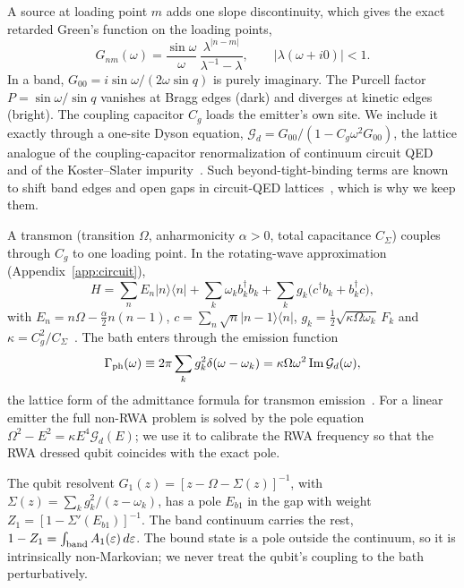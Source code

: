 \documentclass[aps,prresearch,twocolumn,superscriptaddress,nofootinbib,longbibliography,floatfix]{revtex4-2}
\newcommand{\G}{\mathcal{G}}
\begin{document}
A source at loading point $m$ adds one slope discontinuity, which gives the exact retarded
Green's function on the loading points,
\begin{equation}
G_{nm}(\omega)=\frac{\sin\omega}{\omega}\,\frac{\lambda^{|n-m|}}{\lambda^{-1}-\lambda},\qquad |\lambda(\omega+i0)|<1 .
\label{eq:green}
\end{equation}
In a band, $G_{00}=i\sin\omega/(2\omega\sin q)$ is purely imaginary. The Purcell factor $P=\sin\omega/\sin q$ vanishes
at Bragg edges (dark) and diverges at kinetic edges (bright). The coupling capacitor $C_g$ loads the
emitter's own site. We include it exactly through a one-site Dyson equation, $\G_d=G_{00}/(1-C_g\omega^2G_{00})$, the
lattice analogue of the coupling-capacitor renormalization of continuum circuit
QED~\cite{Malekakhlagh2017,Gely2017,ParraRodriguez2018} and of the Koster--Slater impurity~\cite{KosterSlater1954,Economou2006}. Such beyond-tight-binding terms are known to
shift band edges and open gaps in circuit-QED lattices~\cite{Lee2026}, which is why we keep them.

A transmon (transition $\Omega$, anharmonicity $\alpha>0$, total capacitance $C_\Sigma$) couples through $C_g$ to one
loading point. In the rotating-wave approximation (Appendix~\ref{app:circuit}),
\begin{equation}
H=\sum_n E_n|n\rangle\langle n|+\sum_k\omega_kb_k^\dagger b_k+\sum_k g_k\big(c^\dagger b_k+b_k^\dagger c\big),
\label{eq:H}
\end{equation}
with $E_n=n\Omega-\tfrac\alpha2n(n-1)$, $c=\sum_n\sqrt n|n-1\rangle\langle n|$, $g_k=\tfrac12\sqrt{\kappa\Omega\omega_k}\,F_k$
and $\kappa=C_g^2/C_\Sigma$~\cite{Koch2007,Blais2021}. The bath enters through the emission function
\begin{equation}
\Gamma_{\rm ph}(\omega)\equiv2\pi\sum_kg_k^2\delta(\omega-\omega_k)=\kappa\Omega\omega^2\,\mathrm{Im}\,\G_d(\omega),
\label{eq:gph}
\end{equation}
the lattice form of the admittance formula for transmon emission~\cite{Houck2008}.
For a linear emitter the full non-RWA problem is solved by the pole equation $\Omega^2-E^2=\kappa E^4\G_d(E)$; we use it
to calibrate the RWA frequency so that the RWA dressed qubit coincides with the exact pole.

The qubit resolvent $G_1(z)=[z-\Omega-\Sigma(z)]^{-1}$, with $\Sigma(z)=\sum_kg_k^2/(z-\omega_k)$, has
a pole $E_{b1}$ in the gap with weight $Z_1=[1-\Sigma'(E_{b1})]^{-1}$. The band continuum carries the rest,
$1-Z_1=\int_{\rm band}A_1(\varepsilon)\,d\varepsilon$. The bound state is a pole outside the continuum, so it is
intrinsically non-Markovian; we never treat the qubit's coupling to the bath perturbatively.
\end{document}
